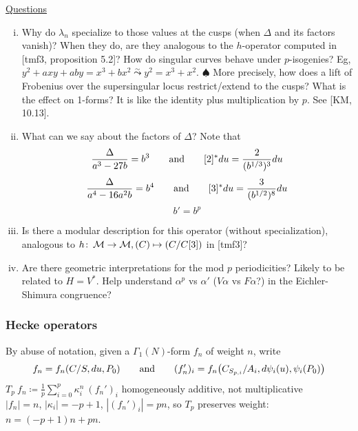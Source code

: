 \documentclass{rs}
\theoremstyle{definition}
\theoremstyle{remark}
\def\co{\colon\thinspace}
\newcommand{\CM}{{\cal M}}
\newcommand{\ad}{{\rm and}}
\newcommand{\A}{\alpha}
\renewcommand{\D}{\Delta}
\newcommand{\G}{\Gamma}
\newcommand{\K}{\kappa}
\renewcommand{\l}{\lambda}
\newcommand{\ce}{\coloneqq}
\newcommand{\todo}{\spadesuit}
\renewcommand{\=}{\approx}
\renewcommand{\-}{\sim}
\numberwithin{equation}{section}
\numberwithin{thm}{section}
\begin{document}
\underline{Questions} 
\begin{enumerate}[(i)]
 \item \label{behave} Why do $\l_n$ specialize to those values 
 at the cusps (when $\D$ and its factors vanish)?  
 When they do, are they analogous to the $h$-operator computed in [tmf3, proposition 5.2]?  
 How do singular curves behave under $p$-isogenies?  
 Eg, $y^2 + a x y + a b y = x^3 + b x^2 \stackrel{\-}{\leadsto} y^2 = x^3 + x^2$.  
 $\todo$ More precisely, how does a lift of Frobenius over the supersingular locus restrict/extend to the cusps?  
 What is the effect on 1-forms?  It is like the identity plus multiplication by $p$.  
 See [KM, 10.13].  

 \item \label{factors} What can we say about the factors of $\D$?  
 Note that 
 \[
  \frac{\D}{a^3 - 27 b} = b^3 \qquad \ad \qquad [2]^* du = \frac{2}{(b^{1/3})^3} du 
 \]
 \[
  \frac{\D}{a^4 - 16 a^2 b} = b^4 \qquad \ad \qquad [3]^* du = \frac{3}{(b^{1/2})^8} du 
 \]
 \[
  b' = b^p 
 \]

 \item \label{moddscrp} Is there a modular description for this operator (without specialization), 
 analogous to $h \co \CM \to \CM, (C) \mapsto (C/C[3])$ in [tmf3]?  

 \item Are there geometric interpretations for the mod $p$ periodicities?  Likely to be related to $H = V^*$.  
 Help understand $\A^p$ vs $\A'$ ($V \A$ vs $F \A$?) in the Eichler-Shimura congruence?  
\end{enumerate}


\subsubsection{Hecke operators}
\label{subsubsec:Hecke-opr}

By abuse of notation, given a $\G_1(N)$-form $f_n$ of weight $n$, write 
\[
 f_n = f_n(C/S, du, P_0) \qquad \ad \qquad (f_n')_i = f_n \! \left( C_{S_{p,i}} / A_i, d\psi_i(u), \psi_i(P_0) \right) 
\]
$\displaystyle T_p ~ f_n \ce \frac{1}{p} \sum_{i=0}^p \K_i^n ~ (f_n')_i$ \qquad\qquad homogeneously additive, not multiplicative \\
$|f_n| = n$, $|\K_i| = -p + 1$, $|(f_n')_i| = p n$, so $T_p$ preserves weight: $n = (-p + 1) n + p n$.  
\end{document}

